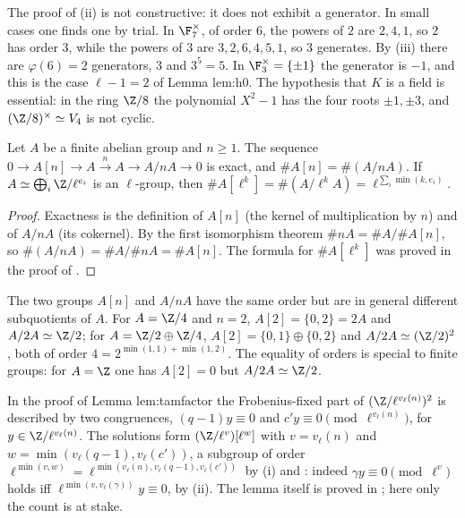 The proof of (ii) is not constructive: it does not exhibit a generator. In small cases one finds one by trial. In $\F_7^\times$, of order $6$, the powers of $2$
are $2,4,1$, so $2$ has order $3$, while the powers of $3$ are $3,2,6,4,5,1$, so $3$ generates. By (iii) there are $\varphi(6)=2$
generators, $3$ and $3^5=5$. In $\F_3^\times=\{\pm1\}$ the generator is $-1$, and this is the case $\ell-1=2$ of Lemma lem:h0. The hypothesis that $K$ is a field
is essential: in the ring $\Z/8$ the polynomial $X^2-1$ has the four roots $\pm1,\pm3$, and $(\Z/8)^\times\simeq V_4$ is not cyclic.

\begin{proposition}\label{prop:groups:torsioncount}
Let $A$ be a finite abelian group and $n\ge1$. The sequence $0\to A[n]\to A\xrightarrow{\,n\,}A\to A/nA\to0$ is exact, and $\#A[n]=\#(A/nA)$. If
$A\simeq\bigoplus_i\Z/\ell^{e_i}$ is an $\ell$-group, then $\#A[\ell^k]=\#(A/\ell^kA)=\ell^{\sum_i\min(k,e_i)}$.
\end{proposition}

\begin{proof}
Exactness is the definition of $A[n]$ (the kernel of multiplication by $n$) and of $A/nA$ (its cokernel). By the first isomorphism theorem
$\#nA=\#A/\#A[n]$, so $\#(A/nA)=\#A/\#nA=\#A[n]$. The formula for $\#A[\ell^k]$ was proved in the proof of .
\end{proof}

The two groups $A[n]$ and $A/nA$ have the same order but are in general different subquotients of $A$. For $A=\Z/4$ and $n=2$, $A[2]=\{0,2\}=2A$ and
$A/2A\simeq\Z/2$; for $A=\Z/2\oplus\Z/4$, $A[2]=\{0,1\}\oplus\{0,2\}$ and $A/2A\simeq(\Z/2)^2$, both of order $4=2^{\min(1,1)+\min(1,2)}$. The equality of orders is
special to finite groups: for $A=\Z$ one has $A[2]=0$ but $A/2A\simeq\Z/2$.

\begin{paperlink}
In the proof of Lemma lem:tamfactor the Frobenius-fixed part of $(\Z/\ell^{v_\ell(n)})^2$ is described by two congruences, $(q-1)y\equiv0$ and
$c'y\equiv0\pmod{\ell^{v_\ell(n)}}$, for $y\in\Z/\ell^{v_\ell(n)}$. The solutions form $(\Z/\ell^{v})[\ell^{w}]$ with $v=v_\ell(n)$ and
$w=\min(v_\ell(q-1),v_\ell(c'))$, a subgroup of order $\ell^{\min(v,w)}=\ell^{\min(v_\ell(n),v_\ell(q-1),v_\ell(c'))}$ by
(i) and : indeed $\gamma y\equiv0\pmod{\ell^v}$ holds iff $\ell^{\min(v,v_\ell(\gamma))}y\equiv0$, by
(ii). The lemma itself is proved in ; here only the count is at stake.
\end{paperlink}

